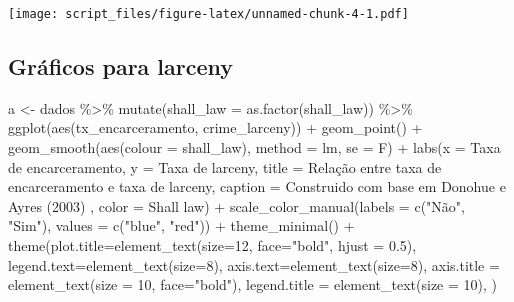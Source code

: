 \documentclass[
]{article}
\newenvironment{Shaded}{\begin{snugshade}}{\end{snugshade}}
\newcommand{\AttributeTok}[1]{\textcolor[rgb]{0.77,0.63,0.00}{#1}}
\newcommand{\DecValTok}[1]{\textcolor[rgb]{0.00,0.00,0.81}{#1}}
\newcommand{\FloatTok}[1]{\textcolor[rgb]{0.00,0.00,0.81}{#1}}
\newcommand{\FunctionTok}[1]{\textcolor[rgb]{0.00,0.00,0.00}{#1}}
\newcommand{\NormalTok}[1]{#1}
\newcommand{\OtherTok}[1]{\textcolor[rgb]{0.56,0.35,0.01}{#1}}
\newcommand{\SpecialCharTok}[1]{\textcolor[rgb]{0.00,0.00,0.00}{#1}}
\newcommand{\StringTok}[1]{\textcolor[rgb]{0.31,0.60,0.02}{#1}}
\begin{document}
\texttt{[image: script\_files/figure-latex/unnamed-chunk-4-1.pdf]}

\hypertarget{gruxe1ficos-para-larceny}{%
\subsection{Gráficos para larceny}\label{gruxe1ficos-para-larceny}}

\begin{Shaded}
\begin{Highlighting}[]
\NormalTok{a }\OtherTok{\textless{}{-}}\NormalTok{ dados }\SpecialCharTok{\%\textgreater{}\%} 
  \FunctionTok{mutate}\NormalTok{(}\AttributeTok{shall\_law =} \FunctionTok{as.factor}\NormalTok{(shall\_law)) }\SpecialCharTok{\%\textgreater{}\%} 
  \FunctionTok{ggplot}\NormalTok{(}\FunctionTok{aes}\NormalTok{(tx\_encarceramento, crime\_larceny)) }\SpecialCharTok{+}
  \FunctionTok{geom\_point}\NormalTok{() }\SpecialCharTok{+} 
  \FunctionTok{geom\_smooth}\NormalTok{(}\FunctionTok{aes}\NormalTok{(}\AttributeTok{colour =}\NormalTok{ shall\_law), }\AttributeTok{method =} \StringTok{\textquotesingle{}lm\textquotesingle{}}\NormalTok{, }\AttributeTok{se =}\NormalTok{ F) }\SpecialCharTok{+}
  \FunctionTok{labs}\NormalTok{(}\AttributeTok{x =} \StringTok{\textquotesingle{}Taxa de encarceramento\textquotesingle{}}\NormalTok{,}
       \AttributeTok{y =} \StringTok{\textquotesingle{}Taxa de larceny\textquotesingle{}}\NormalTok{,}
       \AttributeTok{title =} \StringTok{\textquotesingle{}Relação entre taxa de encarceramento e taxa de larceny\textquotesingle{}}\NormalTok{,}
       \AttributeTok{caption =} \StringTok{\textquotesingle{}Construido com base em Donohue e Ayres (2003)\textquotesingle{}}\NormalTok{ ,}
       \AttributeTok{color =} \StringTok{\textquotesingle{}Shall law\textquotesingle{}}\NormalTok{) }\SpecialCharTok{+} 
  \FunctionTok{scale\_color\_manual}\NormalTok{(}\AttributeTok{labels =} \FunctionTok{c}\NormalTok{(}\StringTok{"Não"}\NormalTok{, }\StringTok{"Sim"}\NormalTok{), }\AttributeTok{values =} \FunctionTok{c}\NormalTok{(}\StringTok{"blue"}\NormalTok{, }\StringTok{"red"}\NormalTok{)) }\SpecialCharTok{+} 
  \FunctionTok{theme\_minimal}\NormalTok{() }\SpecialCharTok{+}
  \FunctionTok{theme}\NormalTok{(}\AttributeTok{plot.title=}\FunctionTok{element\_text}\NormalTok{(}\AttributeTok{size=}\DecValTok{12}\NormalTok{, }\AttributeTok{face=}\StringTok{"bold"}\NormalTok{, }\AttributeTok{hjust =} \FloatTok{0.5}\NormalTok{),}
        \AttributeTok{legend.text=}\FunctionTok{element\_text}\NormalTok{(}\AttributeTok{size=}\DecValTok{8}\NormalTok{),}
        \AttributeTok{axis.text=}\FunctionTok{element\_text}\NormalTok{(}\AttributeTok{size=}\DecValTok{8}\NormalTok{),}
        \AttributeTok{axis.title =} \FunctionTok{element\_text}\NormalTok{(}\AttributeTok{size =} \DecValTok{10}\NormalTok{, }\AttributeTok{face=}\StringTok{"bold"}\NormalTok{),}
        \AttributeTok{legend.title =} \FunctionTok{element\_text}\NormalTok{(}\AttributeTok{size =} \DecValTok{10}\NormalTok{),}
\NormalTok{        )}


\end{Highlighting}
\end{Shaded}
\end{document}
